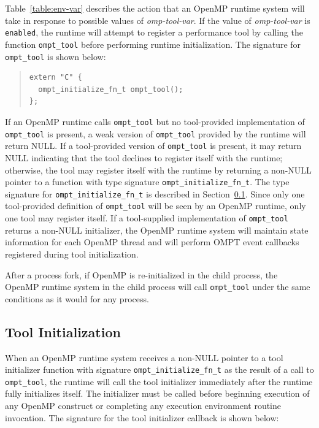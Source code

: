 \documentclass{article}
\begin{document}
\sloppy
Table~\ref{table:env-var} describes the action that an OpenMP runtime system will take in response to possible values of {\em omp-tool-var}.
If the value of {\em omp-tool-var}  is  \verb|enabled|, the runtime will attempt to register  a performance tool by calling the function \verb|ompt_tool| before performing  runtime initialization. The signature for  \verb|ompt_tool|  is shown below:
\begin{quote}
\begin{verbatim}
extern "C" {
  ompt_initialize_fn_t ompt_tool();
};
\end{verbatim}
\end{quote}
If an OpenMP runtime calls \verb|ompt_tool| but no tool-provided implementation of \verb|ompt_tool| is present,
a weak version of \verb|ompt_tool| provided by the runtime  will return NULL. If a tool-provided version of \verb|ompt_tool| is present, it may return NULL indicating that the tool declines to register itself with the runtime; otherwise, the tool  may register itself with the runtime by returning a non-NULL pointer to a function with type signature \verb|ompt_initialize_fn_t|. The type signature for \verb|ompt_initialize_fn_t| is described in Section~\ref{sec:init}. 
Since only one tool-provided definition of \verb|ompt_tool| will be seen by an OpenMP runtime, only one tool may register itself. 
If a tool-supplied implementation of \verb|ompt_tool| returns a non-NULL initializer, the OpenMP runtime system will maintain state information for each OpenMP thread and will perform OMPT event callbacks registered during tool initialization. 

After a process fork, if OpenMP is re-initialized in the child process,
the OpenMP runtime system in the child process will call  \verb|ompt_tool| under the same conditions as it would for any process. 

\subsection{Tool Initialization}
\label{sec:init}

When an OpenMP runtime system receives a non-NULL pointer to a tool initializer function with signature \verb|ompt_initialize_fn_t| as the result of a call to  \verb|ompt_tool|, the runtime will call the tool initializer immediately after the runtime fully initializes itself. The initializer must be called before beginning execution of any OpenMP construct or completing any execution environment  routine invocation.  The signature for the tool initializer callback is shown below:
\end{document}
